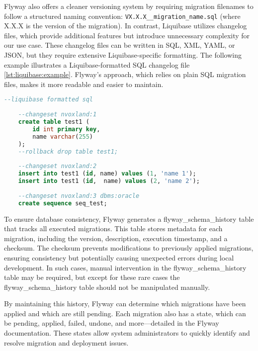 Flyway also offers a cleaner versioning system by requiring migration filenames to follow a structured naming convention: \texttt{VX.X.X\_\_migration\_name.sql} (where X.X.X is the version of the migration). In contrast, Liquibase utilizes changelog files, which provide additional features but introduce unnecessary complexity for our use case. These changelog files can be written in SQL, XML, YAML, or JSON, but they require extensive Liquibase-specific formatting. The following example illustrates a Liquibase-formatted SQL changelog file \ref{lst:liquibase:example}. Flyway’s approach, which relies on plain SQL migration files, makes it more readable and easier to maintain.

\begin{lstlisting}[language=Sql,caption=Liquibase example changelog,label=lst:liquibase:example]
    --liquibase formatted sql
    
    --changeset nvoxland:1
    create table test1 (  
        id int primary key,
        name varchar(255)  
    );  
    --rollback drop table test1; 
    
    --changeset nvoxland:2 
    insert into test1 (id, name) values (1, 'name 1');
    insert into test1 (id,  name) values (2, 'name 2');  
    
    --changeset nvoxland:3 dbms:oracle
    create sequence seq_test;
\end{lstlisting}
    
To ensure database consistency, Flyway generates a flyway\_schema\_history table that tracks all executed migrations. This table stores metadata for each migration, including the version, description, execution timestamp, and a checksum. The checksum prevents modifications to previously applied migrations, ensuring consistency but potentially causing unexpected errors during local development. In such cases, manual intervention in the flyway\_schema\_history table may be required, but except for these rare cases the flyway\_schema\_history table should not be manipulated manually.

By maintaining this history, Flyway can determine which migrations have been applied and which are still pending. Each migration also has a state, which can be pending, applied, failed, undone, and more—detailed in the Flyway documentation. These states allow system administrators to quickly identify and resolve migration and deployment issues.

